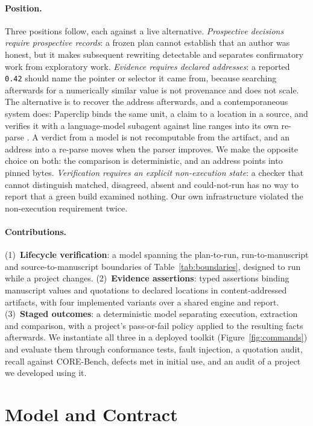 \documentclass{article}
\newcommand{\code}[1]{\texttt{#1}}
\begin{document}
\paragraph{Position.} Three positions follow, each against a live alternative. \emph{Prospective decisions
require prospective records}: a frozen plan cannot establish that an author was honest, but it
makes subsequent rewriting detectable and separates confirmatory work from exploratory work.
\emph{Evidence requires declared addresses}: a reported \code{0.42} should name the pointer or
selector it came from, because searching afterwards for a numerically similar value is not
provenance and does not scale. The alternative is to recover the address afterwards, and a contemporaneous system does:
Paperclip binds the same unit, a claim to a location in a source, and verifies it with a
language-model subagent against line ranges into its own re-parse \citep{gxl2026paperclip}. A
verdict from a model is not recomputable from the artifact, and an address into a re-parse moves
when the parser improves. We make the opposite choice on both: the comparison is deterministic,
and an address points into pinned bytes. \emph{Verification requires an explicit non-execution state}: a
checker that cannot distinguish matched, disagreed, absent and could-not-run has no way to report
that a green build examined nothing. Our own infrastructure violated the non-execution
requirement twice.

\paragraph{Contributions.} (1)~\textbf{Lifecycle verification}: a model spanning the
plan-to-run, run-to-manuscript and source-to-manuscript boundaries of Table~\ref{tab:boundaries},
designed to run while a project changes. (2)~\textbf{Evidence assertions}: typed assertions binding
manuscript values and quotations to declared locations in content-addressed artifacts, with four
implemented variants over a shared engine and report. (3)~\textbf{Staged outcomes}: a deterministic
model separating execution, extraction and comparison, with a project's pass-or-fail policy applied
to the resulting facts afterwards. We instantiate all three in a deployed toolkit (Figure~\ref{fig:commands}) and
evaluate them through conformance tests, fault injection, a quotation audit, recall against
CORE-Bench, defects met in initial use, and an audit of a project we developed using it.


\section{Model and Contract}
\label{sec:construction}
\end{document}
